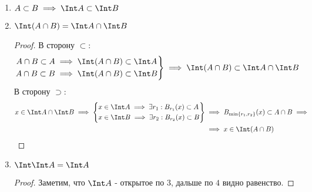 \begin{properties}
\begin{enumerate}
\begin{proof}
                Необходимость ($\implies$): $\Int A$ открыто.

                Достаточность ($\impliedby$): $A$ открыто $\implies$ все точки внутренние $\implies$ $A = \Int A$.
            \end{proof}
        \item $A \subset B \implies \Int A \subset \Int B$
        \item $\Int (A\cap B) = \Int A\cap \Int B$
            \begin{proof} \thmslashn

                В сторону $ \subset $:
                \begin{equation*}
                    \left.
                        \begin{split}
                            A\cap B \subset A 
                            &\implies \Int (A\cap B) \subset \Int A\\
                            A\cap B \subset B 
                            &\implies \Int (A\cap B) \subset \Int B\\
                        \end{split}
                    \right\}
                    \implies \Int (A\cap B) \subset \Int A\cap \Int B
                \end{equation*}
                В сторону $\supset$:
                \begin{equation*}
                    \begin{split}
                        x\in \Int A\cap \Int B \implies
                        \left\{
                            \begin{split}
                                x&\in \Int A \implies \exists{r_1} : B_{r_1}(x) \subset A\\
                                x&\in \Int B \implies \exists{r_2} : B_{r_2}(x) \subset B\\
                            \end{split}
                        \right\} 
                        &\implies B_{\min \{r_1, r_2\} }(x) \subset A\cap B  \implies\\
                        &\implies x\in \Int (A\cap B)
                    \end{split}
                \end{equation*}
            \end{proof}
        \item $\Int \Int A = \Int A$
             \begin{proof} \thmslashn
            
                Заметим, что $\Int A$ - открытое по $3$, дальше по $4$ видно равенство.
            \end{proof}
    \end{enumerate}
\end{properties}
